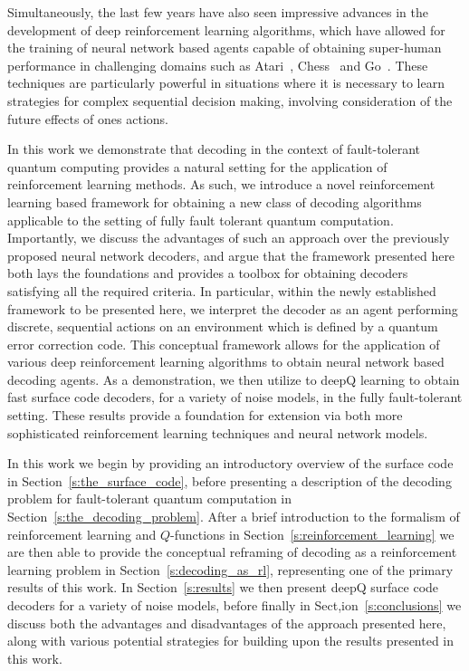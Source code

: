\documentclass[twocolumn,preprintnumbers,amsmath,amssymb,notitlepage,nofootinbib,longbibliography,superscriptaddress,aps,pra,10pt]{revtex4-1}
\begin{document}
	Simultaneously, the last few years have also seen impressive advances in the development of deep reinforcement learning algorithms, which have allowed for the training of neural network based agents capable of obtaining super-human performance in challenging domains such as Atari~\cite{RLMnih15,RLschaul2015prioritized,RLvan2016deep,RLwang2015dueling}, Chess~\cite{RLsilver2017mastering} and Go~\cite{RLSilver2016,RLSilver17b}.
	These techniques are particularly powerful in situations where it is necessary to learn strategies for complex sequential decision making, involving consideration of the future effects of ones actions.

	In this work we demonstrate that decoding in the context of fault-tolerant quantum computing provides a natural setting for the application of reinforcement learning methods.
	As such, we introduce a novel reinforcement learning based framework for obtaining a new class of decoding algorithms applicable to the setting of fully fault tolerant quantum computation.
	Importantly, we discuss the advantages of such an approach over the previously proposed neural network decoders, and argue that the framework presented here both lays the foundations and provides a toolbox for obtaining decoders satisfying all the required criteria.
	In particular, within the newly established framework to be presented here, we interpret the decoder as an agent performing discrete, sequential actions on an environment which is defined by a quantum error correction code.
	This conceptual framework allows for the application of various deep reinforcement learning algorithms to obtain neural network based decoding agents.
	As a demonstration, we then utilize to deepQ learning to obtain fast surface code decoders, for a variety of noise models, in the fully fault-tolerant setting.
	These results provide a foundation for extension via both more sophisticated reinforcement learning techniques and neural network models.

	In this work we begin by providing an introductory overview of the surface code in Section~\ref{s:the_surface_code}, before presenting a description of the decoding problem for fault-tolerant quantum computation in Section~\ref{s:the_decoding_problem}.
	After a brief introduction to the formalism of reinforcement learning and $Q$-functions in Section~\ref{s:reinforcement_learning} we are then able to provide the conceptual reframing of decoding as a reinforcement learning problem in Section~\ref{s:decoding_as_rl}, representing one of the primary results of this work.
	In Section~\ref{s:results} we then present deepQ surface code decoders for a variety of noise models, before finally in Sect,ion~\ref{s:conclusions} we discuss both the advantages and disadvantages of the approach presented here, along with various potential strategies for building upon the results presented in this work.
\end{document}
